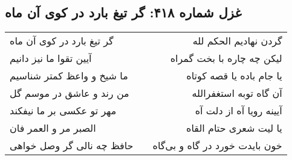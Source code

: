 \begin{center}
\section*{غزل شماره ۴۱۸: گر تیغ بارد در کوی آن ماه}
\label{sec:sh418}
\begin{longtable}{l p{0.5cm} r}
گر تیغ بارد در کوی آن ماه
&&
گردن نهادیم الحکم لله
\\
آیین تقوا ما نیز دانیم
&&
لیکن چه چاره با بخت گمراه
\\
ما شیخ و واعظ کمتر شناسیم
&&
یا جام باده یا قصه کوتاه
\\
من رند و عاشق در موسم گل
&&
آن گاه توبه استغفرالله
\\
مهر تو عکسی بر ما نیفکند
&&
آیینه رویا آه از دلت آه
\\
الصبر مر و العمر فان
&&
یا لیت شعری حتام القاه
\\
حافظ چه نالی گر وصل خواهی
&&
خون بایدت خورد در گاه و بی‌گاه
\\
\end{longtable}
\end{center}

